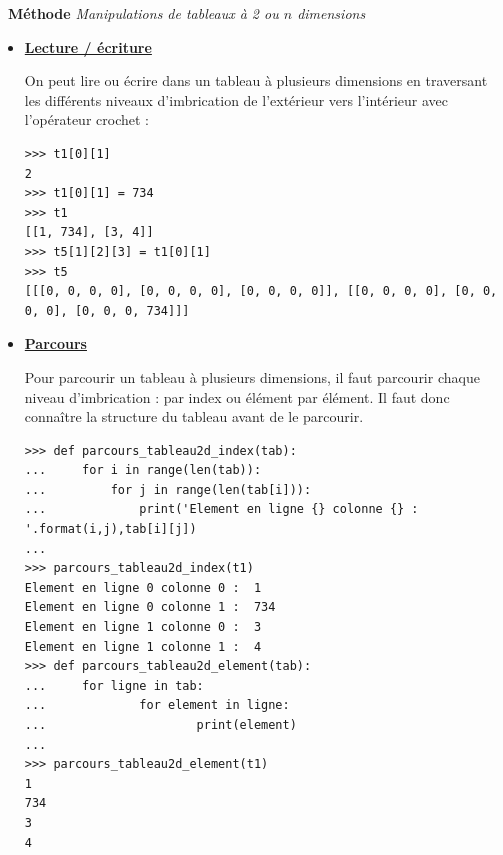 \documentclass[a4paper, french, 12pt]{article}
\newcounter{def}
\newcounter{cours}
\newenvironment{methode}[1]
{\par \medskip    \noindent  
 \begin {bclogo}[arrondi =0.1,logo=\bcoutil, marge=4,noborder = true] {~\textbf{Méthode}   {\itshape #1} }  \par}
{
\end{bclogo}
 \par \bigskip }
\begin{document}
\begin{methode}{Manipulations de tableaux à 2 ou $n$ dimensions}
\begin{itemize}
\begin{itemize}
\end{itemize}

\item \underline{\textbf{Lecture / écriture}}

On peut lire ou écrire dans un tableau à plusieurs dimensions en traversant les différents niveaux d'imbrication de l'extérieur vers l'intérieur avec l'opérateur crochet :

\begin{lstlisting}[style=compil]
>>> t1[0][1]
2
>>> t1[0][1] = 734
>>> t1
[[1, 734], [3, 4]]
>>> t5[1][2][3] = t1[0][1]
>>> t5
[[[0, 0, 0, 0], [0, 0, 0, 0], [0, 0, 0, 0]], [[0, 0, 0, 0], [0, 0, 0, 0], [0, 0, 0, 734]]]
\end{lstlisting}

\item \underline{\textbf{Parcours}}

Pour parcourir un tableau à plusieurs dimensions, il faut parcourir chaque niveau d'imbrication : par index ou élément par élément. Il faut donc connaître la structure du tableau avant de le parcourir.  

\begin{lstlisting}[style=compil]
>>> def parcours_tableau2d_index(tab):
...     for i in range(len(tab)):
...     	for j in range(len(tab[i])):
...         	print('Element en ligne {} colonne {} : '.format(i,j),tab[i][j])
... 
>>> parcours_tableau2d_index(t1)
Element en ligne 0 colonne 0 :  1
Element en ligne 0 colonne 1 :  734
Element en ligne 1 colonne 0 :  3
Element en ligne 1 colonne 1 :  4
>>> def parcours_tableau2d_element(tab):
...     for ligne in tab:
...             for element in ligne:
...                     print(element)
... 
>>> parcours_tableau2d_element(t1)
1
734
3
4
\end{lstlisting}

\end{itemize}


\end{methode}


\vspace*{-20pt}
\end{document}
